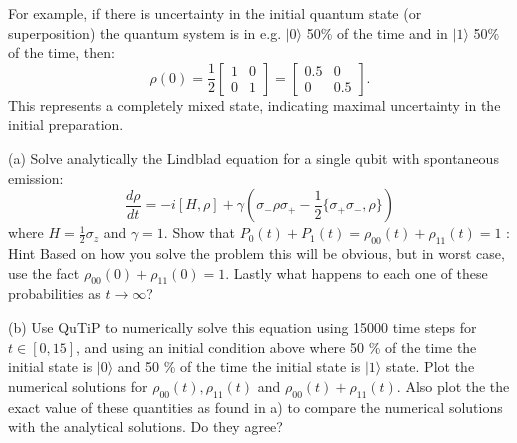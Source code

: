 \documentclass[12pt]{article}
\newcommand{\ket}[1]{| #1 \rangle}
\begin{document}
For example, if there is uncertainty in the initial quantum state (or superposition) the quantum system is in e.g. $|0\rangle$ 50\% of the time and in $|1\rangle$ 50\% of the time, then:
\begin{equation*}
    \rho(0) = \frac{1}{2} \begin{bmatrix} 1 & 0 \\ 0 & 1 \end{bmatrix} = \begin{bmatrix} 0.5 & 0 \\ 0 & 0.5 \end{bmatrix}.
\end{equation*}
This represents a completely mixed state, indicating maximal uncertainty in the initial preparation.

(a) Solve analytically the Lindblad equation for a single qubit with spontaneous emission:
\begin{equation}
    \frac{d\rho}{dt} = -i[H, \rho] + \gamma (\sigma_- \rho \sigma_+ - \frac{1}{2}\{\sigma_+ \sigma_-, \rho\})
\end{equation}
where $H = \frac{1}{2} \sigma_z$ and $\gamma = 1$. Show that $P_0(t) + P_1(t) = \rho_{00}(t) + \rho_{11}(t)=1 $ : Hint Based on how you solve the problem this will be obvious, but in worst case, use the fact $\rho_{00}(0) +\rho_{11}(0)=1$. Lastly what happens to each one of these probabilities as $t \rightarrow \infty$?

(b) Use QuTiP to numerically solve this equation using 15000 time steps for $t\in[0,15]$, and using an initial condition above where 50 \% of the time the initial state is $\ket{0}$ and 50 \% of the time the initial state is $\ket{1}$ state. Plot  the numerical solutions for $\rho_{00}(t), \rho_{11}(t)$ and $\rho_{00}(t) + \rho_{11}(t)$. Also plot the the exact value of these quantities as found in a) to compare the numerical solutions with the analytical solutions. Do they agree? 
\end{document}
